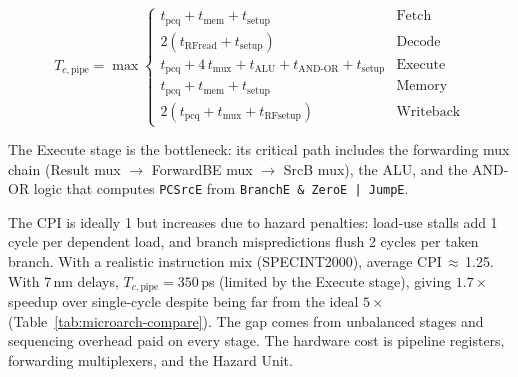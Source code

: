\documentclass[9pt, a4paper]{extarticle}
\begin{document}
$$
T_{c,\text{pipe}} = \max\!\begin{cases}
    t_{\text{pcq}} + t_{\text{mem}} + t_{\text{setup}} & \text{Fetch} \\
    2(t_{\text{RFread}} + t_{\text{setup}}) & \text{Decode} \\
    t_{\text{pcq}} + 4\,t_{\text{mux}} + t_{\text{ALU}} + t_{\text{AND-OR}} + t_{\text{setup}} & \text{Execute} \\
    t_{\text{pcq}} + t_{\text{mem}} + t_{\text{setup}} & \text{Memory} \\
    2(t_{\text{pcq}} + t_{\text{mux}} + t_{\text{RFsetup}}) & \text{Writeback}
\end{cases}
$$

The Execute stage is the bottleneck: its critical path includes the forwarding mux chain (Result mux $\to$ ForwardBE mux $\to$ SrcB mux), the ALU, and the AND-OR logic that computes \texttt{PCSrcE} from \texttt{BranchE \& ZeroE | JumpE}.

The CPI is ideally 1 but increases due to hazard penalties: load-use stalls add 1 cycle per dependent load, and branch mispredictions flush 2 cycles per taken branch. With a realistic instruction mix (SPECINT2000), average CPI\,$\approx$\,1.25. With 7\,nm delays, $T_{c,\text{pipe}} = 350$\,ps (limited by the Execute stage), giving $1.7\times$ speedup over single-cycle despite being far from the ideal $5\times$ (Table~\ref{tab:microarch-compare}). The gap comes from unbalanced stages and sequencing overhead paid on every stage. The hardware cost is pipeline registers, forwarding multiplexers, and the Hazard Unit.
\end{document}
